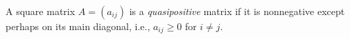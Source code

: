 \documentclass[12pt]{article}
\begin{document}
A square matrix $A=(a_{ij})$ is a \emph{quasipositive} matrix if it is nonnegative except perhaps on its main diagonal, i.e., $a_{ij}\geq 0$ for $i\neq j$.
\end{document}
